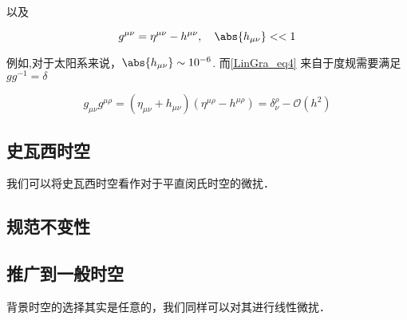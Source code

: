 以及

\begin{equation}
g^{\mu\nu} = \eta^{\mu\nu} - h^{\mu\nu} , \quad \abs{h_{\mu\nu}}<<1 
\end{equation}



例如,对于太阳系来说，$\abs{h_{\mu\nu}} \sim 10^{-6}$. 而\autoref{LinGra_eq4}  来自于度规需要满足$gg^{-1}=\delta$

\begin{equation}
g_{\mu\nu}g^{\mu\rho} = (\eta_{\mu\nu} + h_{\mu\nu})(\eta^{\mu\rho} - h^{\mu\rho}) = \delta^{\rho}_{\nu} - \mathcal{O}(h^2)
\end{equation}





\subsection{史瓦西时空}

我们可以将史瓦西时空看作对于平直闵氏时空的微扰．


\subsection{规范不变性}


\subsection{推广到一般时空}

背景时空的选择其实是任意的，我们同样可以对其进行线性微扰．

\label{Sample_eq2}